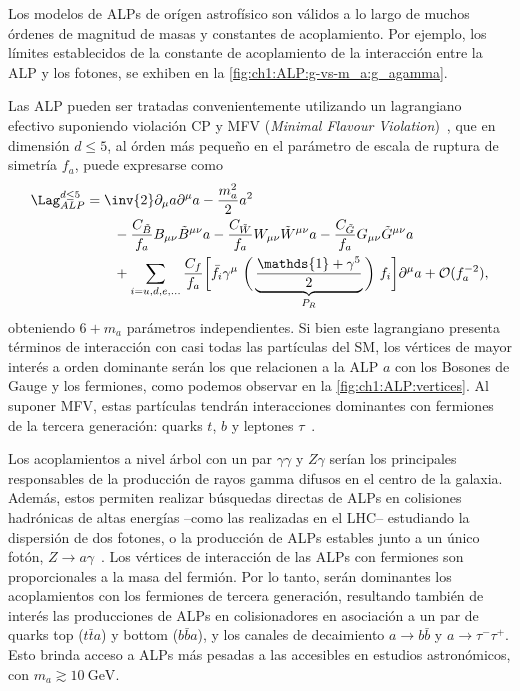 Los modelos de ALPs de orígen astrofísico son válidos a lo largo de muchos órdenes de magnitud de masas y constantes de acoplamiento. Por ejemplo, los límites establecidos de la constante de acoplamiento de la interacción entre la ALP y los fotones, se exhiben en la \cref{fig:ch1:ALP:g-vs-m_a:g_agamma}.

Las ALP pueden ser tratadas convenientemente utilizando un lagrangiano efectivo suponiendo violación CP y MFV (\textit{Minimal Flavour Violation})~\cite{DAmbrosio2002}, que en dimensión $d \leq 5$, al órden más pequeño en el parámetro de escala de ruptura de simetría $f_a$, puede expresarse como
\begin{align*}
  \Lag_{ALP}^{d \leq 5} &= \inv{2} \partial_\mu a \partial^\mu a - \frac{m_a^2}{2} a^2 \\*
             &\quad\quad - \frac{C_{\tilde{B}}}{f_a} B_{\mu\nu} \tilde{B}^{\mu\nu} a - \frac{C_{\tilde{W}}}{f_a} W_{\mu\nu} \tilde{W}^{\mu\nu} a - \frac{C_{\tilde{G}}}{f_a} G_{\mu\nu} \tilde{G}^{\mu\nu} a \\*
             &\quad\quad + \sum_{i = u, d, e, \dots} \frac{C_f}{f_a} \bigg[ \bar{f}_i \gamma^\mu \ \bigg( \underbrace{\frac{\mathds{1} + \gamma^5}{2}}_{P_R} \bigg) \ f_i \bigg] \partial^\mu a + \mathcal{O}( f_a^{-2} ),
\end{align*}
obteniendo $6 + m_a$ parámetros independientes. Si bien este lagrangiano presenta términos de interacción con casi todas las partículas del SM, los vértices de mayor interés a orden dominante serán los que relacionen a la ALP $a$ con los Bosones de Gauge y los fermiones, como podemos observar en la \cref{fig:ch1:ALP:vertices}. Al suponer MFV, estas partículas tendrán interacciones dominantes con fermiones de la tercera generación: quarks $t$, $b$ y leptones $\tau$~\cites[-2em][]{Bauer2017}{Bauer2017a}{Bauer2019}.

Los acoplamientos a nivel árbol con un par $\gamma\gamma$ y $Z\gamma$ serían los principales responsables de la producción de rayos gamma difusos en el centro de la galaxia. Además, estos permiten realizar búsquedas directas de ALPs en colisiones hadrónicas de altas energías --como las realizadas en el LHC-- estudiando la dispersión de dos fotones, o la producción de ALPs estables junto a un único fotón, $Z \to a\gamma$~\cites[-1.2em][]{Schmieden2021}{TheATLASCollaboration2021}. Los vértices de interacción de las ALPs con fermiones son proporcionales a la masa del fermión. Por lo tanto, serán dominantes los acoplamientos con los fermiones de tercera generación, resultando también de interés las producciones de ALPs en colisionadores en asociación a un par de quarks top ($t\bar{t}a$) y bottom ($b\bar{b}a$), y los canales de decaimiento $a \to b\bar{b}$ y $a \to \tau^-\tau^+$. Esto brinda acceso a ALPs más pesadas a las accesibles en estudios astronómicos, con $m_a \gtrsim \SI{10}{\GeV}$. 

